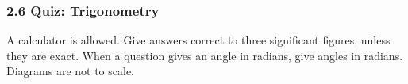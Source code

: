 \documentclass[12pt, twoside]{article}
\begin{document}
\subsubsection*{2.6 Quiz: Trigonometry}

\begin{center}
\end{center}

A calculator is allowed. Give answers correct to three significant figures,
unless they are exact. When a question gives an angle in radians, give
angles in radians. Diagrams are not to scale.
\end{document}
